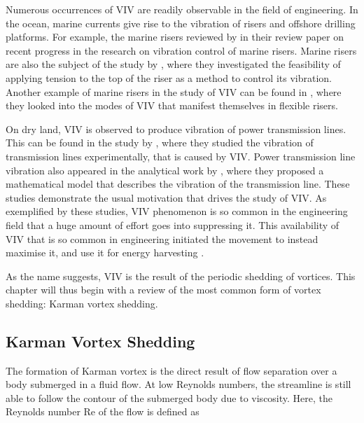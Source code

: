 \documentclass[oneside]{utmthesis}
\begin{document}
Numerous occurrences of VIV are readily observable in the field of engineering. In the ocean, marine currents give rise to the vibration of risers and offshore drilling platforms. For example, the marine risers reviewed by \citet{Liu2020} in their review paper on recent progress in the research on vibration control of marine risers. Marine risers are also the subject of the study by \citet{Zhang2020}, where they investigated the feasibility of applying tension to the top of the riser as a method to control its vibration. Another example of marine risers in the study of VIV can be found in \citet{Meng2020}, where they looked into the modes of VIV that manifest themselves in flexible risers.


On dry land, VIV is observed to produce vibration of power transmission lines. This can be found in the study by \citet{Gomez-Ortega2019a}, where they studied the vibration of transmission lines experimentally, that is caused by VIV. Power transmission line vibration also appeared in the analytical work by \citet{Gomez-Ortega2019b}, where they proposed a mathematical model that describes the vibration of the transmission line. These studies demonstrate the usual motivation that drives the study of VIV. As exemplified by these studies, VIV phenomenon is so common in the engineering field that a huge amount of effort goes into suppressing it. This availability of VIV that is so common in engineering initiated the movement to instead maximise it, and use it for energy harvesting \citep{Barati2022}.

As the name suggests, VIV is the result of the periodic shedding of vortices. This chapter will thus begin with a review of the most common form of vortex shedding: Karman vortex shedding.

\subsection{Karman Vortex Shedding} \label{ssec:kvShedding}

The formation of Karman vortex is the direct result of flow separation over a body submerged in a fluid flow. At low Reynolds numbers, the streamline is still able to follow the contour of the submerged body due to viscosity.  Here, the Reynolds number Re of the flow is defined as
\end{document}

